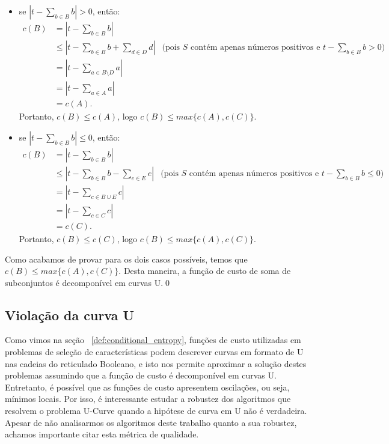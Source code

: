\begin{itemize}
    \item{se $|t - \sum_{b \in B} b| > 0$, então:}
    \begin{align*}
        c (B) & =  |t - \sum_{b \in B} b|  & \\
              & \leq  |t - \sum_{b \in B} b + \sum_{d \in D} d| & 
                \text{(pois $S$ contém apenas números positivos e $t -
                \sum_{b \in B} b > 0$)} \\
              & = |t - \sum_{a \in B \setminus D} a| \\
              & = |t - \sum_{a \in A} a| \\
              & = c (A).
    \end{align*}
    Portanto, $c (B) \leq  c (A)$, logo $c (B) \leq max \{c (A), c (C)\}$.
    
    \item{se $|t - \sum_{b \in B} b| \leq 0$, então:}
    \begin{align*}
        c (B) & =  |t - \sum_{b \in B} b|  & \\
              & \leq  |t - \sum_{b \in B} b - \sum_{e \in E} e| & 
                \text{(pois $S$ contém apenas números positivos e $t -
                \sum_{b \in B} b \leq 0$)} \\
              & = |t - \sum_{c \in B \cup E} c| \\
              & = |t - \sum_{c \in C} c| \\
              & = c (C).
    \end{align*}
    Portanto, $c (B) \leq  c (C)$, logo $c (B) \leq max \{c (A), c (C)\}$.
\end{itemize}
Como acabamos de provar para os dois casos possíveis, temos que 
$c (B) \leq max \{c (A), c (C)\}$. Desta maneira, a função de custo de
soma de subconjuntos é decomponível em curvas U.\qed

\subsection{Violação da curva U}
Como vimos na seção ~\ref{def:conditional_entropy}, funções de custo 
utilizadas em problemas de seleção de características podem descrever 
curvas em formato de U nas cadeias do reticulado Booleano, e isto nos 
permite aproximar a solução destes problemas assumindo que a função de 
custo é decomponível em curvas U. Entretanto, é possível que as funções
de custo apresentem oscilações, ou seja, mínimos locais. Por isso, é 
interessante estudar a robustez dos algoritmos que resolvem o problema 
U-Curve quando a hipótese de curva em U não é verdadeira. Apesar de não 
analisarmos os algoritmos deste trabalho quanto a sua robustez, achamos 
importante citar esta métrica de qualidade.


